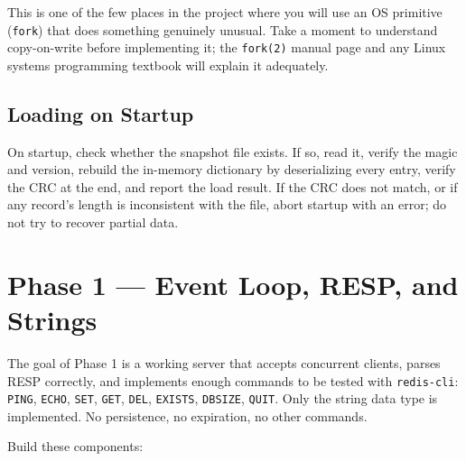\documentclass[11pt,a4paper]{article}
\begin{document}
This is one of the few places in the project where you will use an OS primitive (\texttt{fork}) that does something genuinely unusual. Take a moment to understand copy-on-write before implementing it; the \texttt{fork(2)} manual page and any Linux systems programming textbook will explain it adequately.

\subsection{Loading on Startup}
On startup, check whether the snapshot file exists. If so, read it, verify the magic and version, rebuild the in-memory dictionary by deserializing every entry, verify the CRC at the end, and report the load result. If the CRC does not match, or if any record's length is inconsistent with the file, abort startup with an error; do not try to recover partial data.

\section{Phase 1 --- Event Loop, RESP, and Strings}

The goal of Phase 1 is a working server that accepts concurrent clients, parses RESP correctly, and implements enough commands to be tested with \texttt{redis-cli}: \texttt{PING}, \texttt{ECHO}, \texttt{SET}, \texttt{GET}, \texttt{DEL}, \texttt{EXISTS}, \texttt{DBSIZE}, \texttt{QUIT}. Only the string data type is implemented. No persistence, no expiration, no other commands.

Build these components:
\end{document}
